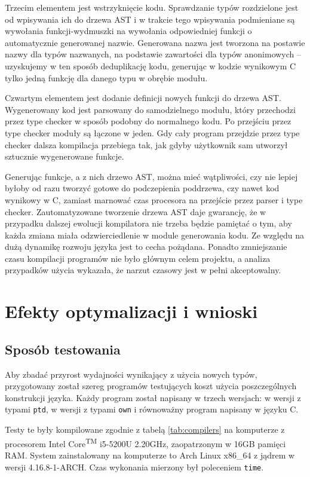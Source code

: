 \documentclass[licencjacka]{pracamgr}
\begin{document}
Trzecim elementem jest wstrzyknięcie kodu. Sprawdzanie typów rozdzielone jest od wpisywania ich do drzewa AST
i w trakcie tego wpisywania podmieniane są wywołania funkcji-wydmuszki na wywołania
odpowiedniej funkcji o automatycznie generowanej nazwie. Generowana nazwa jest tworzona na postawie nazwy dla typów nazwanych, na podstawie zawartości
dla typów anonimowych -- uzyskujemy w ten sposób deduplikację kodu, generując w kodzie wynikowym C tylko jedną funkcję dla danego typu w obrębie modułu.

Czwartym elementem jest dodanie definicji nowych funkcji do drzewa AST. Wygenerowany kod jest parsowany do samodzielnego modułu,
który przechodzi przez type checker w sposób podobny do normalnego kodu. Po przejściu przez type checker moduły są łączone w jeden. Gdy cały program przejdzie przez type checker
dalsza kompilacja przebiega tak, jak gdyby użytkownik sam utworzył sztucznie wygenerowane funkcje.

Generując funkcje, a z nich drzewo AST, można mieć wątpliwości, czy nie lepiej byłoby od razu tworzyć gotowe do podczepienia poddrzewa, czy nawet kod wynikowy w C,
zamiast marnować czas procesora na przejście przez parser i type checker. 
Zautomatyzowane tworzenie drzewa AST daje gwarancję, że w przypadku dalszej ewolucji kompilatora nie trzeba będzie pamiętać o tym,
aby każda zmiana miała odzwierciedlenie w module generowania kodu. Ze względu na dużą dynamikę rozwoju języka jest to cecha pożądana.
Ponadto zmniejszanie czasu kompilacji programów nie było głównym celem projektu, a analiza przypadków użycia wykazała, że narzut czasowy jest w pełni akceptowalny.

\chapter{Efekty optymalizacji i wnioski}
\section{Sposób testowania}
Aby zbadać przyrost wydajności wynikający z użycia nowych typów, przygotowany został szereg programów testujących
koszt użycia poszczególnych konstrukcji języka.
Każdy program został napisany w trzech wersjach: w wersji z typami \texttt{ptd}, w wersji z typami \texttt{own}
i równoważny program napisany w języku C.

Testy te były kompilowane zgodnie z tabelą \ref{tab:compilers} na komputerze z procesorem 
Intel\textsuperscript{\tiny{\textregistered}} Core\textsuperscript{\tiny{TM}} i5-5200U 2.20GHz,
zaopatrzonym w 16GB pamięci RAM. System zainstalowany na komputerze to Arch Linux x86\_64
z jądrem w wersji 4.16.8-1-ARCH. Czas wykonania mierzony był poleceniem \texttt{time}.
\end{document}
